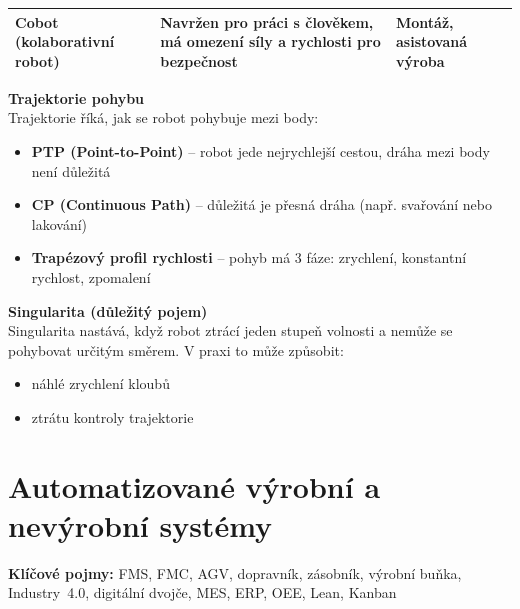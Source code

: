 \documentclass[a4paper,10pt]{article}
\begin{document}
\begin{vysvetlenibox}
\begin{center}
\begin{tabularx}{0.95\linewidth}{@{} l X l @{}}
Cobot (kolaborativní robot) &
Navržen pro práci s člověkem,
má omezení síly a rychlosti pro bezpečnost &
Montáž, asistovaná výroba \\

\bottomrule
\end{tabularx}
\end{center}

\textbf{Trajektorie pohybu}\\
Trajektorie říká, jak se robot pohybuje mezi body:

\begin{itemize}[noitemsep, leftmargin=1.4em]
    \item \textbf{PTP (Point-to-Point)} -- robot jede nejrychlejší cestou,
    dráha mezi body není důležitá
    \item \textbf{CP (Continuous Path)} -- důležitá je přesná dráha
    (např. svařování nebo lakování)
    \item \textbf{Trapézový profil rychlosti} -- pohyb má 3 fáze:
    zrychlení, konstantní rychlost, zpomalení
\end{itemize}

\textbf{Singularita (důležitý pojem)}\\
Singularita nastává, když robot ztrácí jeden stupeň volnosti
a nemůže se pohybovat určitým směrem.
V praxi to může způsobit:
\begin{itemize}[noitemsep]
    \item náhlé zrychlení kloubů
    \item ztrátu kontroly trajektorie
\end{itemize}

\end{vysvetlenibox}



\newpage

\section{Automatizované výrobní a nevýrobní systémy}

\begin{pojmybox}
\textbf{Klíčové pojmy:}
FMS, FMC, AGV, dopravník, zásobník, výrobní buňka,
Industry~4.0, digitální dvojče, MES, ERP, OEE, Lean, Kanban
\end{pojmybox}
\end{document}
